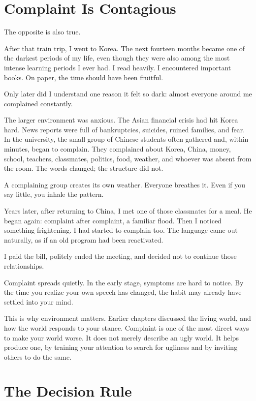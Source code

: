 \section*{Complaint Is Contagious}

The opposite is also true.

After that train trip, I went to Korea. The next fourteen months became one of the darkest periods of my life, even though they were also among the most intense learning periods I ever had. I read heavily. I encountered important books. On paper, the time should have been fruitful.

Only later did I understand one reason it felt so dark: almost everyone around me complained constantly.

The larger environment was anxious. The Asian financial crisis had hit Korea hard. News reports were full of bankruptcies, suicides, ruined families, and fear. In the university, the small group of Chinese students often gathered and, within minutes, began to complain. They complained about Korea, China, money, school, teachers, classmates, politics, food, weather, and whoever was absent from the room. The words changed; the structure did not.

A complaining group creates its own weather. Everyone breathes it. Even if you say little, you inhale the pattern.

Years later, after returning to China, I met one of those classmates for a meal. He began again: complaint after complaint, a familiar flood. Then I noticed something frightening. I had started to complain too. The language came out naturally, as if an old program had been reactivated.

I paid the bill, politely ended the meeting, and decided not to continue those relationships.

Complaint spreads quietly. In the early stage, symptoms are hard to notice. By the time you realize your own speech has changed, the habit may already have settled into your mind.

This is why environment matters. Earlier chapters discussed the living world, and how the world responds to your stance. Complaint is one of the most direct ways to make your world worse. It does not merely describe an ugly world. It helps produce one, by training your attention to search for ugliness and by inviting others to do the same.

\section*{The Decision Rule}

